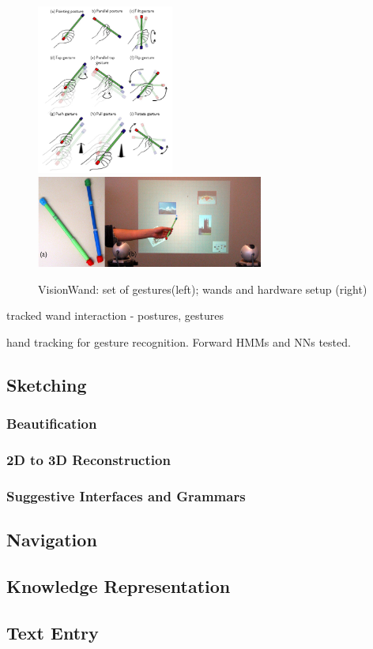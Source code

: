 \begin{figure}[!ht]
	\centering
	\includegraphics[width=4.5cm]{gfx/visionwand.png}
	\includegraphics[width=7.5cm]{gfx/visionwand2.png}
	\caption{VisionWand: set of gestures(left); wands and hardware setup (right)}
	\label{FIG-VISIONWAND}
\end{figure}


\cite{WAND}
tracked wand interaction - postures, gestures

\cite{GESREC}
hand tracking for gesture recognition. Forward HMMs and NNs tested.



\subsection{Sketching}
\subsubsection{Beautification}
\subsubsection{2D to 3D Reconstruction}
\subsubsection{Suggestive Interfaces and Grammars}

\subsection{Navigation}

\subsection{Knowledge Representation}

\subsection{Text Entry}

